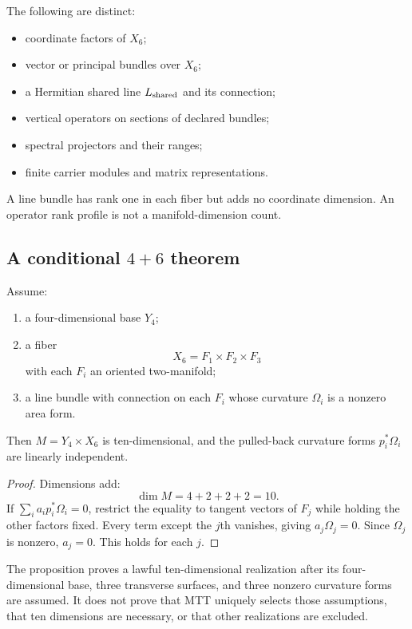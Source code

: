 \documentclass[11pt]{article}
\begin{document}
The following are distinct:
\begin{itemize}
\item coordinate factors of $X_6$;
\item vector or principal bundles over $X_6$;
\item a Hermitian shared line $L_{\rm shared}$ and its connection;
\item vertical operators on sections of declared bundles;
\item spectral projectors and their ranges;
\item finite carrier modules and matrix representations.
\end{itemize}
A line bundle has rank one in each fiber but adds no coordinate dimension.
An operator rank profile is not a manifold-dimension count.

\subsection{A conditional \texorpdfstring{$4+6$}{4+6} theorem}

\begin{proposition}
\label{prop:fourplussix}
Assume:
\begin{enumerate}[label=(\roman*)]
\item a four-dimensional base $Y_4$;
\item a fiber
\[
X_6=F_1\times F_2\times F_3
\]
with each $F_i$ an oriented two-manifold;
\item a line bundle with connection on each $F_i$ whose curvature
$\Omega_i$ is a nonzero area form.
\end{enumerate}
Then $M=Y_4\times X_6$ is ten-dimensional, and the pulled-back curvature
forms $p_i^\ast\Omega_i$ are linearly independent.
\end{proposition}

\begin{proof}
Dimensions add:
\[
\dim M=4+2+2+2=10.
\]
If $\sum_i a_i p_i^\ast\Omega_i=0$, restrict the equality to tangent vectors
of $F_j$ while holding the other factors fixed.  Every term except the
$j$th vanishes, giving $a_j\Omega_j=0$.  Since $\Omega_j$ is nonzero,
$a_j=0$.  This holds for each $j$.
\end{proof}

\begin{remark}
The proposition proves a lawful ten-dimensional realization after its
four-dimensional base, three transverse surfaces, and three nonzero curvature
forms are assumed.  It does not prove that MTT uniquely selects those
assumptions, that ten dimensions are necessary, or that other realizations are
excluded.
\end{remark}
\end{document}
